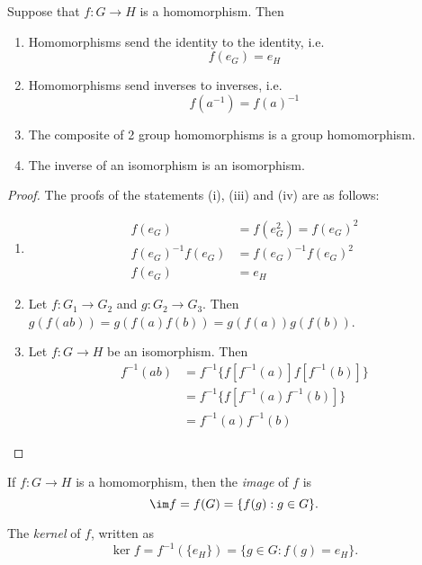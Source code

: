\documentclass[a4paper]{article}
\begin{document}
  \begin{prop}
    Suppose that $f: G\rightarrow H$ is a homomorphism. Then
    \begin{enumerate}
      \item Homomorphisms send the identity to the identity, i.e.
        \[
          f(e_G) = e_H
        \]
      \item Homomorphisms send inverses to inverses, i.e.
        \[
          f(a^{-1}) = f(a)^{-1}
        \]
      \item The composite of 2 group homomorphisms is a group homomorphism.
      \item The inverse of an isomorphism is an isomorphism.
    \end{enumerate}
  \end{prop}
  \begin{proof}
    The proofs of the statements (i), (iii) and (iv) are as follows:
    \begin{enumerate}
      \item \begin{align*}
          f(e_G) &= f(e_G^2) = f(e_G)^2\\
          f(e_G)^{-1}f(e_G) &= f(e_G)^{-1}f(e_G)^2\\
          f(e_G) &= e_H
        \end{align*}
        \setcounter{enumi}{2}
      \item Let $f:G_1 \rightarrow G_2$ and $g:G_2 \rightarrow G_3$. Then $g(f(ab)) = g(f(a)f(b)) = g(f(a))g(f(b))$.
      \item Let $f:G \rightarrow H$ be an isomorphism. Then
        \begin{align*}
          f^{-1}(ab) &= f^{-1}\{f[f^{-1}(a)]f[f^{-1}(b)]\}\\
          &= f^{-1}\{f[f^{-1}(a)f^{-1}(b)]\}\\
          &= f^{-1}(a)f^{-1}(b)
        \end{align*}
    \end{enumerate}
  \end{proof}

  \begin{defi}
    If $f:G\rightarrow H$ is a homomorphism, then the \emph{image} of $f$ is
    \[
      \im f = f(G) = \{f(g):g\in G\}.
    \]
  \end{defi}

  \begin{defi}
    The \emph{kernel} of $f$, written as
    \[
      \ker f = f^{-1}(\{e_H\}) = \{g\in G:f(g)=e_H\}.
    \]
  \end{defi}
\end{document}
